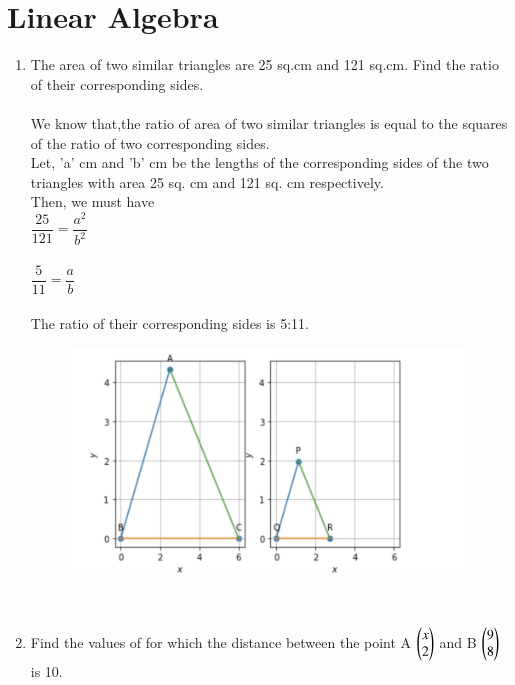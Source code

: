 \documentclass[journal,12pt,twocolumn]{IEEEtran}
\renewcommand\thesection{\arabic{section}}
\begin{document}
\section{Linear Algebra}
\renewcommand{\theequation}{\theenumi}
\begin{enumerate}[label=\thesection.\arabic*.,ref=\thesection.\theenumi]
\item The area of two similar triangles are 25 sq.cm and 121 sq.cm. Find the ratio of their corresponding sides. \\
\solution \\
We know that,the ratio of area of two similar triangles is equal to the squares of the ratio of two corresponding sides.\\
Let, 'a' cm and 'b' cm be the lengths of the corresponding sides of the two triangles with area 25 sq. cm and 121 sq. cm respectively.\\
Then, we must have\\
$\dfrac{25}{121} = \dfrac{a^2}{b^2}$\\ \\
$\dfrac{5}{11} = \dfrac{a}{b}$\\ \\
The ratio of their corresponding sides is 5:11.\\
 \begin{figure}
	  \centering 
	  \includegraphics[width=\columnwidth]{3.1}
	  \caption{}
	  \label{fig:geometry-3.9.pdf}
 \end{figure}\\ 
\item Find the values of for which the distance between the point A $\begin{pmatrix}x\\2\end{pmatrix}$ and B $\begin{pmatrix}9\\8\end{pmatrix}$ is 10.\\

\end{enumerate}
\end{document}
